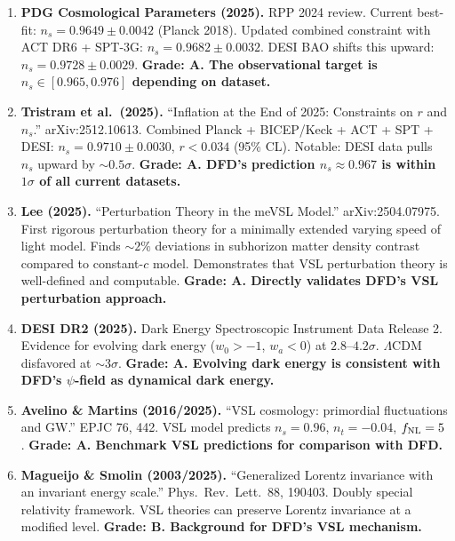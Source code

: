 \documentclass[11pt,a4paper]{article}
\begin{document}
\begin{enumerate}
\item \textbf{PDG Cosmological Parameters (2025).} RPP 2024 review. Current best-fit: $n_s = 0.9649 \pm 0.0042$ (Planck 2018). Updated combined constraint with ACT DR6 + SPT-3G: $n_s = 0.9682 \pm 0.0032$. DESI BAO shifts this upward: $n_s = 0.9728 \pm 0.0029$. \textbf{Grade: A. The observational target is $n_s \in [0.965, 0.976]$ depending on dataset.}

\item \textbf{Tristram et al.\ (2025).} ``Inflation at the End of 2025: Constraints on $r$ and $n_s$.'' arXiv:2512.10613. Combined Planck + BICEP/Keck + ACT + SPT + DESI: $n_s = 0.9710 \pm 0.0030$, $r < 0.034$ (95\% CL). Notable: DESI data pulls $n_s$ upward by $\sim 0.5\sigma$. \textbf{Grade: A. DFD's prediction $n_s \approx 0.967$ is within $1\sigma$ of all current datasets.}

\item \textbf{Lee (2025).} ``Perturbation Theory in the meVSL Model.'' arXiv:2504.07975. First rigorous perturbation theory for a minimally extended varying speed of light model. Finds $\sim 2\%$ deviations in subhorizon matter density contrast compared to constant-$c$ model. Demonstrates that VSL perturbation theory is well-defined and computable. \textbf{Grade: A. Directly validates DFD's VSL perturbation approach.}

\item \textbf{DESI DR2 (2025).} Dark Energy Spectroscopic Instrument Data Release 2. Evidence for evolving dark energy ($w_0 > -1$, $w_a < 0$) at $2.8$--$4.2\sigma$. $\Lambda$CDM disfavored at $\sim 3\sigma$. \textbf{Grade: A. Evolving dark energy is consistent with DFD's $\psi$-field as dynamical dark energy.}

\item \textbf{Avelino \& Martins (2016/2025).} ``VSL cosmology: primordial fluctuations and GW.'' EPJC 76, 442. VSL model predicts $n_s = 0.96$, $n_t = -0.04$, $f_{\rm NL} = 5$. \textbf{Grade: A. Benchmark VSL predictions for comparison with DFD.}

\item \textbf{Magueijo \& Smolin (2003/2025).} ``Generalized Lorentz invariance with an invariant energy scale.'' Phys.\ Rev.\ Lett.\ 88, 190403. Doubly special relativity framework. VSL theories can preserve Lorentz invariance at a modified level. \textbf{Grade: B. Background for DFD's VSL mechanism.}
\end{enumerate}
\end{document}
